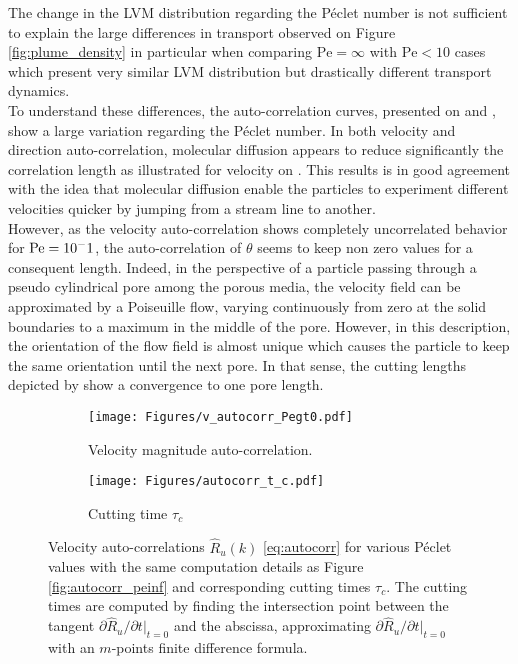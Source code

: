 The change in the LVM distribution regarding the Péclet number is not sufficient to explain the large differences in transport observed on Figure \ref{fig:plume_density} in particular when comparing $\mathrm{Pe}=\infty$ with $\mathrm{Pe}<10$ cases which present very similar LVM distribution but drastically different transport dynamics.\\
To understand these differences, the auto-correlation curves, presented on  and , show a large variation regarding the Péclet number.
In both velocity and direction auto-correlation, molecular diffusion appears to reduce significantly the correlation length as illustrated for velocity on .
This results is in good agreement with the idea that molecular diffusion enable the particles to experiment different velocities quicker by jumping from a stream line to another.\\
However, as the velocity auto-correlation shows completely uncorrelated behavior for $\mathrm{Pe}=10^-1$, the auto-correlation of $\theta$ seems to keep non zero values for a consequent length.
Indeed, in the perspective of a particle passing through a pseudo cylindrical pore among the porous media, the velocity field can be approximated by a Poiseuille flow, varying continuously from zero at the solid boundaries to a maximum in the middle of the pore.
However, in this description, the orientation of the flow field is almost unique which causes the particle to keep the same orientation until the next pore.
In that sense, the cutting lengths depicted by  show a convergence to one pore length.
\begin{figure}[h!]
	\centering
	\begin{subfigure}[b]{0.49\textwidth}
		\centering
		\texttt{[image: Figures/v\_autocorr\_Pegt0.pdf]}
		\caption{Velocity magnitude auto-correlation.}
		\label{fig:autocorrv}
	\end{subfigure}
	\hfill
	\begin{subfigure}[b]{0.49\textwidth}
		\centering
		\texttt{[image: Figures/autocorr\_t\_c.pdf]}
		\caption{Cutting time $\tau_c$}
		\label{fig:autocorr_t_c}
	\end{subfigure}
	\caption{Velocity auto-correlations $\hat{R}_u(k)$ \eqref{eq:autocorr} for various Péclet values with the same computation details as Figure \ref{fig:autocorr_peinf} and corresponding cutting times $\tau_c$. The cutting times are computed by finding the intersection point between the tangent $\partial\hat{R}_u/\partial t|_{t=0}$ and the abscissa, approximating $\partial\hat{R}_u/\partial t|_{t=0}$ with an $m$-points finite difference formula.}
	\label{fig:autocorr}
\end{figure}

